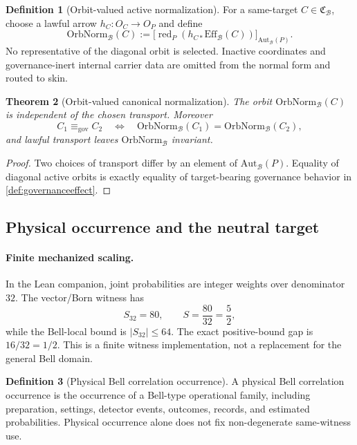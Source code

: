 \documentclass[11pt]{article}
\newtheorem{theorem}{Theorem}[section]
\theoremstyle{definition}
\newtheorem{definition}[theorem]{Definition}
\newcommand{\Bell}{\mathcal{B}}
\newcommand{\AutBell}{\mathrm{Aut}_{\Bell}(P)}
\newcommand{\GovEq}{\equiv_{\mathrm{gov}}}
\newcommand{\BellConstr}{\mathfrak{C}_{\Bell}}
\newcommand{\GovEff}{\mathrm{Eff}_{\Bell}}
\newcommand{\OrbitNorm}{\mathrm{OrbNorm}_{\Bell}}
\newcommand{\ActRed}{\operatorname{red}_{P}}
\begin{document}
\begin{definition}[Orbit-valued active normalization]\label{def:orbitnormalization}
For a same-target $C\in\BellConstr$, choose a lawful arrow $h_C:O_C\to O_P$ and define
\[
\OrbitNorm(C):=
\bigl[\ActRed(h_{C*}\GovEff(C))\bigr]_{\AutBell}.
\]
No representative of the diagonal orbit is selected. Inactive coordinates and governance-inert internal carrier data are omitted from the normal form and routed to skin.
\end{definition}

\begin{theorem}[Orbit-valued canonical normalization]\label{thm:canonicalnormalization}
The orbit $\OrbitNorm(C)$ is independent of the chosen transport. Moreover
\[
C_1\GovEq C_2\quad\Longleftrightarrow\quad
\OrbitNorm(C_1)=\OrbitNorm(C_2),
\]
and lawful transport leaves $\OrbitNorm$ invariant.
\end{theorem}
\begin{proof}
Two choices of transport differ by an element of $\AutBell$. Equality of diagonal active orbits is exactly equality of target-bearing governance behavior in \cref{def:governanceeffect}.
\end{proof}

\subsection{Physical occurrence and the neutral target}

\paragraph{Finite mechanized scaling.}
In the Lean companion, joint probabilities are integer weights over denominator $32$. The vector/Born witness has
\[
S_{32}=80,\qquad S=\frac{80}{32}=\frac52,
\]
while the Bell-local bound is $|S_{32}|\le64$. The exact positive-bound gap is $16/32=1/2$. This is a finite witness implementation, not a replacement for the general Bell domain.

\begin{definition}[Physical Bell correlation occurrence]
A physical Bell correlation occurrence is the occurrence of a Bell-type operational family, including preparation, settings, detector events, outcomes, records, and estimated probabilities. Physical occurrence alone does not fix non-degenerate same-witness use.
\end{definition}
\end{document}
